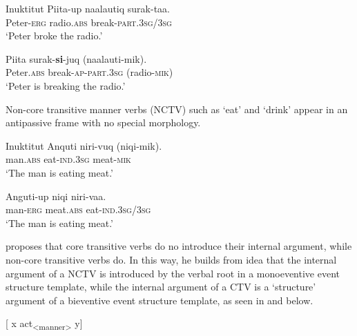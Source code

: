\documentclass[output=paper,colorlinks,citecolor=brown,nonflat]{./langscibook}
\begin{document}
\ea%
    Inuktitut \citep{Spreng2012} \label{ex:basilico:3}
    \ea \label{ex:basilico:3a}
    \gll Piita-up  naalautiq  surak-taa. \\
    Peter-\textsc{erg}  radio.\textsc{abs} break-\textsc{part}.3\textsc{sg}/3\textsc{sg}\\
    \glt ‘Peter broke the radio.’
    
    \ex \label{ex:basilico:3b}
    \gll Piita    surak-\textbf{si}{}-juq    (naalauti-mik).\\
    Peter.\textsc{abs}  break-\textsc{ap}{}-\textsc{{part}}.3\textsc{sg}  (radio{}-\textsc{mik})\\
    \glt ‘Peter is breaking the radio.’
    
    \z
    \z

Non-core transitive manner verbs (NCTV) such as ‘eat’ and ‘drink’ appear in an antipassive frame with no special morphology. 

\ea%
    Inuktitut \citep{Spreng2012}\label{ex:basilico:4}
    \ea \label{ex:basilico:4a}
    \gll Anquti  niri-vuq  (niqi-mik).\\
    man.\textsc{{abs}}  eat{}-\textsc{{ind}}.3\textsc{sg}  meat{}-\textsc{mik}\\
    \glt `The man is eating meat.'
    
    \ex \label{ex:basilico:4b}
    \gll Anguti-up  niqi    niri-vaa.\\
    man{}-\textsc{{erg}}  meat.\textsc{{abs}}  eat{}-\textsc{{ind}}.3\textsc{sg}/3\textsc{sg}
    \\
    \glt `The man is eating meat.'
    \z
    \z


\citet{Basilico2017} proposes that core transitive verbs do no introduce their internal argument, while non-core transitive verbs do. In this way, he builds from  idea that the internal argument of a NCTV is introduced by the verbal root in a monoeventive event structure template, while the internal argument of a CTV is a ‘structure’ argument of a bieventive event structure template, as seen in  and  below.

\ea%
    \label{ex:basilico:5}
     {[} x act\textsubscript{<manner>} y{]}
    \z
\end{document}
